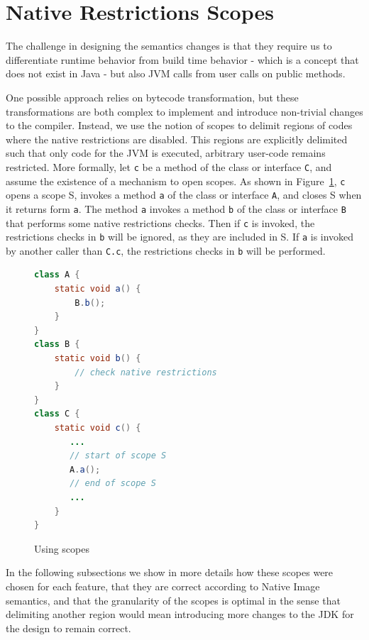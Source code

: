\section{Native Restrictions Scopes}
The challenge in designing the semantics changes is that they require us to differentiate runtime behavior from build time behavior - which is a concept that does not exist in Java - but also JVM calls from user calls on public methods.

One possible approach relies on bytecode transformation, but these transformations are both complex to implement and introduce non-trivial changes to the compiler. 
Instead, we use the notion of scopes to delimit regions of codes where the native restrictions are disabled. This regions are explicitly delimited such that only code for the JVM is executed, arbitrary user-code remains restricted.
More formally, let \verb|c| be a method of the class or interface \verb|C|, and assume the existence of a mechanism to open scopes. As shown in Figure~\ref{fig:scopes}, \verb|c| opens a scope S, invokes a method \verb|a| of the class or interface \verb|A|, and closes S when it returns form \verb|a|.
The method \verb|a| invokes a method \verb|b| of the class or interface \verb|B| that performs some native restrictions checks.
Then if \verb|c| is invoked, the restrictions checks in \verb|b| will be ignored, as they are included in S.
If \verb|a| is invoked by another caller than \verb|C.c|, the restrictions checks in \verb|b| will be performed.

\begin{figure}[ht]
    \centering
\begin{lstlisting}[language=Java]
class A {
    static void a() {
        B.b(); 
    }
} 
class B {
    static void b() {
        // check native restrictions
    }
}
class C {
    static void c() {
       ...
       // start of scope S
       A.a();
       // end of scope S
       ...
    }
}
\end{lstlisting}
    \caption{Using scopes}
    \label{fig:scopes}
\end{figure}


In the following subsections we show in more details how these scopes were chosen for each feature, that they are correct according to Native Image semantics, and that the granularity of the scopes is optimal in the sense that delimiting another region would mean introducing more changes to the JDK for the design to remain correct.

